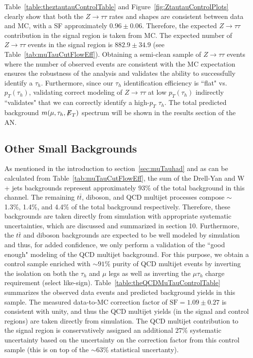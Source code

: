 Table~\ref{table:theztautauControlTable} and Figure~\ref{fig:ZtautauControlPlots} clearly show that both the $Z \to \tau\tau$ rates and shapes are consistent 
between data and MC, with a SF approximately $0.96 \pm 0.06$. Therefore, the expected $Z \to \tau\tau$ contribution in the signal region is taken from MC. The 
expected number of $Z \to \tau\tau$ events in the signal region is $882.9 \pm 34.9$ (see Table~\ref{tab:muTauCutFlowEff}). 
Obtaining a semi-clean sample of $Z \to \tau\tau$ events where the number of observed events are consistent with the MC expectation ensures the robustness of the 
analysis and validates the ability to successfully identify a $\tau_{h}$. Furthermore, since our $\tau_{h}$ identification efficiency is ``flat" vs. 
$p_{T}(\tau_{h})$, validating correct modeling of $Z \to \tau\tau$ at low $p_{T}(\tau_{h})$ indirectly ``validates" that we can correctly identify a high-$p_{T}$ 
$\tau_{h}$. The total predicted background $m(\mu,\tau_{h},{\not\mathrel{E}}_T)$ spectrum will be shown in the results section of the AN.

\subsection{Other Small Backgrounds}

As mentioned in the introduction to section~\ref{sec:muTauhad} and as can be calculated from Table~\ref{tab:muTauCutFlowEff}, the sum of the Drell-Yan and W + 
jets backgrounds represent approximately $93$\% of the total background in this channel. The remaining $t\bar{t}$, diboson, and QCD multijet processes compose 
$\sim$ 1.3\%, 1.4\%, and 4.4\% of the total background respectively. Therefore, these backgrounds are taken directly from simulation with appropriate systematic 
uncertainties, which are discussed and summarized in section 10. Furthermore, the $t\bar{t}$ and diboson backgrounds are expected to be well modeled by simulation 
and thus, for added confidence, we only perform a validation of the ``good enough" modeling of the QCD multijet background. For this purpose, we obtain a control 
sample enriched with $\sim 91$\% purity of QCD multijet events by inverting the isolation on both the $\tau_{h}$ and $\mu$ legs as well as inverting the 
$\mu\tau_{h}$ charge requirement (select like-sign). Table~\ref{table:theQCDMuTauControlTable} summarizes the observed data events and predicted background yields 
in this sample. The measured data-to-MC correction factor of $\textrm{SF}=1.09 \pm 0.27$ is consistent with unity, and thus the QCD multijet yields (in the 
signal and control regions) are taken directly from simulation. The QCD multijet contribution to the signal region is conservatively assigned an additional $27$\% 
systematic uncertainty based on the uncertainty on the correction factor from this control sample (this is on top of the $\sim 63$\% statistical uncertanty).

